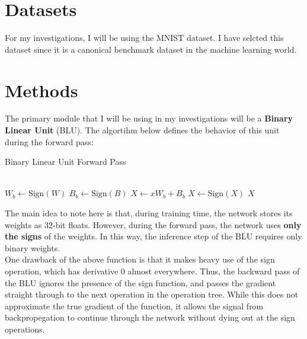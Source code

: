\documentclass{article}
\begin{document}
  \section{Datasets}
    For my investigations, I will be using the MNIST \cite{mnist} dataset. I have selcted this dataset since it is a canonical benchmark dataset in the machine learning world.

  \section{Methods}
    The primary module that I will be using in my investigations will be a \textbf{Binary Linear Unit} (BLU). The algortihm below defines the behavior of this unit during the forward pass:\\[6pt]

    \begin{algorithm}
      \caption{Binary Linear Unit Forward Pass}\label{BLUfp}
      \begin{algorithmic}
        \\
          \State $W_b \leftarrow \text{Sign}(W)$
          \State $B_b \leftarrow \text{Sign}(B)$
          \State $X \leftarrow xW_b + B_b$
          \State $X \leftarrow \text{Sign}(X)$
          \State \Return $X$
        \EndFunction
      \end{algorithmic}
    \end{algorithm}

    The main idea to note here is that, during training time, the network stores its weights as 32-bit floats.
    However, during the forward pass, the network uses \textbf{only the signs} of the weights.
    In this way, the inference step of the BLU requires only binary weights.\\[6pt]

    One drawback of the above function is that it makes heavy use of the sign operation, which has derivative 0 almost everywhere.
    Thus, the backward pass of the BLU ignores the presence of the sign function, and passes the gradient straight through to the next operation in the operation tree.
    While this does not approximate the true gradient of the function, it allows the signal from backpropegation to continue through the network without dying out at the sign operations.\\[6pt]
\end{document}
